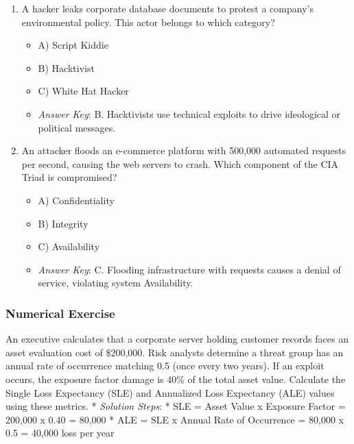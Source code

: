 \documentclass[12pt,openany]{book}
\begin{document}
\begin{enumerate}

  \item A hacker leaks corporate database documents to protest a company's environmental policy. This actor belongs to which category?

\begin{itemize}

  \item A) Script Kiddie

  \item B) Hacktivist

  \item C) White Hat Hacker

  \item \textit{Answer Key}: B. Hacktivists use technical exploits to drive ideological or political messages.

\end{itemize}

  \item An attacker floods an e-commerce platform with 500,000 automated requests per second, causing the web servers to crash. Which component of the CIA Triad is compromised?

\begin{itemize}

  \item A) Confidentiality

  \item B) Integrity

  \item C) Availability

  \item \textit{Answer Key}: C. Flooding infrastructure with requests causes a denial of service, violating system Availability.

\end{itemize}

\end{enumerate}


\subsubsection*{Numerical Exercise}


An executive calculates that a corporate server holding customer records faces an asset evaluation cost of \$200,000. Risk analysts determine a threat group has an annual rate of occurrence matching 0.5 (once every two years). If an exploit occurs, the exposure factor damage is 40\% of the total asset value. Calculate the Single Loss Expectancy (SLE) and Annualized Loss Expectancy (ALE) values using these metrics.
* \textit{Solution Steps}:
    * SLE = Asset Value x Exposure Factor = 200,000 x 0.40 = 80,000
    * ALE = SLE x Annual Rate of Occurrence = 80,000 x 0.5 = 40,000 loss per year
\end{document}

